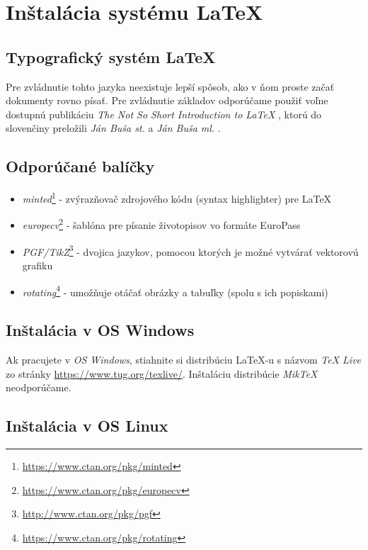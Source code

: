 \chapter{Inštalácia systému \LaTeX}
\label{ch:instalacia}

\section{Typografický systém \LaTeX}

Pre zvládnutie tohto jazyka neexistuje lepší spôsob, ako v ňom proste začať dokumenty rovno písať. Pre zvládnutie základov odporúčame použiť voľne dostupnú publikáciu \emph{The Not So Short Introduction to \LaTeX} \cite{lshort}, ktorú do slovenčiny preložili \emph{Ján Buša st.} a \emph{Ján Buša ml.} \cite{lshortsk}.

\section{Odporúčané balíčky}
\begin{itemize}
    \item \emph{minted}\footnote{\url{https://www.ctan.org/pkg/minted}} - zvýrazňovač zdrojového kódu (syntax highlighter) pre \LaTeX 
    \item \emph{europecv}\footnote{\url{https://www.ctan.org/pkg/europecv}} - šablóna pre písanie životopisov vo formáte EuroPass 
    \item \emph{PGF/TikZ}\footnote{\url{http://www.ctan.org/pkg/pgf}} - dvojica jazykov, pomocou ktorých je možné vytvárať vektorovú grafiku 
    \item \emph{rotating}\footnote{\url{https://www.ctan.org/pkg/rotating}} - umožňuje otáčať obrázky a tabuľky (spolu s ich popiskami)
\end{itemize}

\section{Inštalácia v OS Windows}

Ak pracujete v \emph{OS Windows}, stiahnite si distribúciu \LaTeX-u s názvom \emph{TeX Live} zo stránky \url{https://www.tug.org/texlive/}. Inštaláciu distribúcie \emph{MikTeX} neodporúčame.


\section{Inštalácia v OS Linux}

